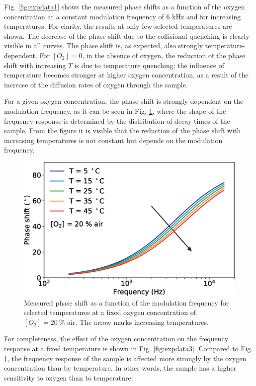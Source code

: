 \documentclass[final,5p,times,twocolumn]{elsarticle}
\begin{document}
Fig. \ref{fig:expdata1} shows the measured phase shifts as a function of the oxygen concentration at a constant modulation frequency of 6 kHz and for increasing temperatures. For clarity, the results at only few selected temperatures are shown. The decrease of the phase shift due to the collisional quenching is clearly visible in all curves. The phase shift is, as expected, also strongly  temperature-dependent. For $[O_2]=0$, in the absence of oxygen, the reduction of the phase shift with increasing $T$ is due to temperature quenching; the influence of temperature becomes stronger at higher oxygen concentration, as a result of the increase of the diffusion rates of oxygen through the sample.

For a given oxygen concentration, the phase shift is strongly dependent on the modulation frequency, as it can be seen in Fig. \ref{fig:expdata2}, where the shape of the frequency response is determined by the distribution of decay times of the sample. From the figure it is visible that the reduction of the phase shift with increasing temperatures is not constant but depends on the modulation frequency.

\begin{figure}[t!]
\centering
\includegraphics[width=8.2 cm]{phase_f_T.eps}
\caption{Measured phase shift as a function of the modulation frequency for selected temperatures at a fixed oxygen concentration of $[O_2]=20 \  \%$ air. The arrow marks increasing temperatures.}
\label{fig:expdata2}
\end{figure}

For completeness, the effect of the oxygen concentration on the frequency response at a fixed temperature is shown in Fig. \ref{fig:expdata3}. Compared to Fig. \ref{fig:expdata2}, the frequency response of the sample is affected more strongly by the oxygen concentration than by temperature. In other words, the sample has a higher sensitivity to oxygen than to temperature.
\end{document}
